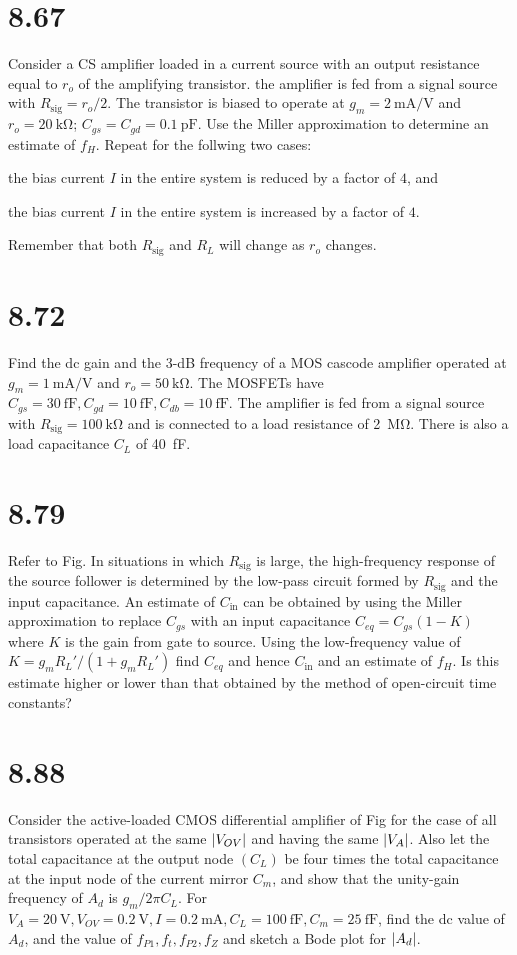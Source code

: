 \documentclass[12pt, a4paper]{article}
\begin{document}
\section{8.67}
Consider a CS amplifier loaded in a current source with an output resistance
equal to $r_o$ of the amplifying transistor. the amplifier is fed from a
signal source with $R_{\text{sig}} = r_o/2$. The transistor is biased to
operate at $g_m = \SI{2}{\mA/\V}$ and $r_o = \SI{20}{\kohm}$;
$C_{gs} = C_{gd} = \SI{0.1}{\pF}$. Use the Miller approximation to
determine an estimate of $f_H$. Repeat for the follwing two cases:
\begin{enumerate*}[(i)]
  \item the bias current $I$ in the entire system is reduced by a factor of
    $4$, and
  \item the bias current $I$ in the entire system is increased by a factor of
    $4$.
\end{enumerate*}
Remember that both $R_{\text{sig}}$ and $R_L$ will change as $r_o$ changes.

\section{8.72}
Find the dc gain and the 3-dB frequency of a MOS cascode amplifier operated
at $g_m = \SI{1}{\mA/\V}$ and $r_o = \SI{50}{\kohm}$. The MOSFETs have
$C_{gs} = \SI{30}{\fF}, C_{gd} = \SI{10}{\fF}, C_{db} = \SI{10}{\fF}$.
The amplifier is fed from a signal source with
$R_{\text{sig}} = \SI{100}{\kohm}$ and is connected to a load resistance of
\SI{2}{\Mohm}. There is also a load capacitance $C_L$ of \SI{40}{\fF}.
\section{8.79}
Refer to Fig. In situations in which $R_{\text{sig}}$ is large, the
high-frequency response of the source follower is determined by the low-pass
circuit formed by $R_{\text{sig}}$ and the input capacitance. An estimate
of $C_{\text{in}}$ can be obtained by using the Miller approximation to
replace $C_{gs}$ with an input capacitance $C_{eq} = C_{gs}(1-K)$ where $K$
is the gain from gate to source. Using the low-frequency value of
$K = g_mR_L'/(1+g_mR_L')$ find $C_{eq}$ and hence $C_{\text{in}}$ and an
estimate of $f_H$. Is this estimate higher or lower than that obtained by the
method of open-circuit time constants?

\section{8.88}
Consider the active-loaded CMOS differential amplifier of Fig for
the case of all transistors operated at the same $\lvert V_{OV}\rvert$ and having
the same $\lvert V_A\rvert$. Also let the total capacitance at the output node
$(C_L)$ be four times the total capacitance at the input node of the
current mirror $C_m$, and show that the unity-gain frequency of $A_d$ is
$g_m/2\pi C_L$. For $V_A=\SI{20}{\V}, V_{OV}=\SI{0.2}{\V}, I=\SI{0.2}{\mA},
C_L=\SI{100}{\fF},C_m=\SI{25}{\fF}$, find the dc value of $A_d$, and the
value of $f_{P1}, f_t, f_{P2}, f_Z$ and sketch a Bode plot for $\lvert A_d\rvert$.
\end{document}
